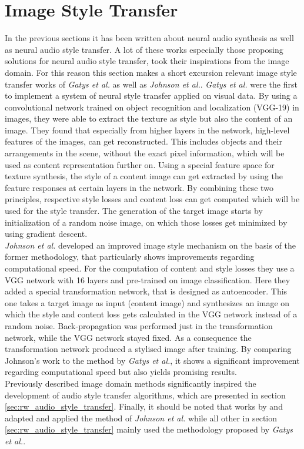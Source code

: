 \section{Image Style Transfer}
\label{sec:rw_imgstyletransfer}
In the previous sections it has been written about neural audio synthesis as well as neural audio style transfer. A lot of these works especially those proposing solutions for neural audio style transfer, took their inspirations from the image domain. For this reason this section makes a short excursion relevant image style transfer works of \textit{Gatys et al.} as well as \textit{Johnson et al.}. \cite{Gatys2016, johnson2016perceptual} \textit{Gatys et al.} were the first to implement a system of neural style transfer applied on visual data. By using a convolutional network trained on object recognition and localization (VGG-19) in images, they were able to extract the texture as style but also the content of an image. They found that especially from higher layers in the network, high-level features of the images, can get reconstructed. This includes objects and their arrangements in the scene, without the exact pixel information, which will be used as content representation further on. Using a special feature space for texture synthesis, the style of a content image can get extracted by using the feature responses at certain layers in the network. By combining these two principles, respective style losses and content loss can get computed which will be used for the style transfer. The generation of the target image starts by initialization of a random noise image, on which those losses get minimized by using gradient descent.\\
\textit{Johnson et al.} developed an improved image style mechanism on the basis of the former methodology, that particularly shows improvements regarding computational speed. For the computation of content and style losses they use a VGG network with 16 layers and pre-trained on image classification. Here they added a special transformation network, that is designed as autoencoder. This one takes a target image as input (content image) and synthesizes an image on which the style and content loss gets calculated in the VGG network instead of a random noise. Back-propagation was performed just in the transformation network, while the VGG network stayed fixed. As a consequence the transformation network produced a stylised image after training. By comparing Johnson's work to the method by \textit{Gatys et al.}, it shows a significant improvement regarding computational speed but also yields promising results.\\
Previously described image domain methods significantly inspired the development of audio style transfer algorithms, which are presented in section \ref{sec:rw_audio_style_transfer}. Finally, it should be noted that works by \cite{Ramani2018} and \cite{Liu2019} adapted and applied the method of \textit{Johnson et al.} while all other in section \ref{sec:rw_audio_style_transfer} mainly used the methodology proposed by \textit{Gatys et al.}.
